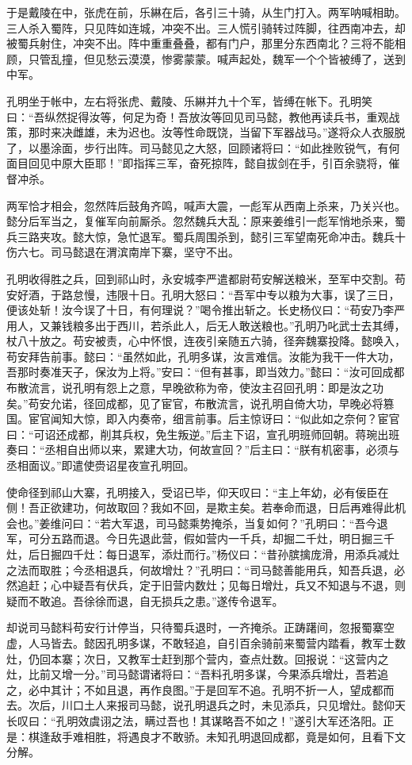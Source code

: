 于是戴陵在中，张虎在前，乐綝在后，各引三十骑，从生门打入。两军呐喊相助。三人杀入蜀阵，只见阵如连城，冲突不出。三人慌引骑转过阵脚，往西南冲去，却被蜀兵射住，冲突不出。阵中重重叠叠，都有门户，那里分东西南北？三将不能相顾，只管乱撞，但见愁云漠漠，惨雾蒙蒙。喊声起处，魏军一个个皆被缚了，送到中军。

孔明坐于帐中，左右将张虎、戴陵、乐綝并九十个军，皆缚在帐下。孔明笑曰：“吾纵然捉得汝等，何足为奇！吾放汝等回见司马懿，教他再读兵书，重观战策，那时来决雌雄，未为迟也。汝等性命既饶，当留下军器战马。”遂将众人衣服脱了，以墨涂面，步行出阵。司马懿见之大怒，回顾诸将曰：“如此挫败锐气，有何面目回见中原大臣耶！”即指挥三军，奋死掠阵，懿自拔剑在手，引百余骁将，催督冲杀。

两军恰才相会，忽然阵后鼓角齐鸣，喊声大震，一彪军从西南上杀来，乃关兴也。懿分后军当之，复催军向前厮杀。忽然魏兵大乱：原来姜维引一彪军悄地杀来，蜀兵三路夹攻。懿大惊，急忙退军。蜀兵周围杀到，懿引三军望南死命冲击。魏兵十伤六七。司马懿退在渭滨南岸下寨，坚守不出。

孔明收得胜之兵，回到祁山时，永安城李严遣都尉苟安解送粮米，至军中交割。苟安好酒，于路怠慢，违限十日。孔明大怒曰：“吾军中专以粮为大事，误了三日，便该处斩！汝今误了十日，有何理说？”喝令推出斩之。长史杨仪曰：“苟安乃李严用人，又兼钱粮多出于西川，若杀此人，后无人敢送粮也。”孔明乃叱武士去其缚，杖八十放之。苟安被责，心中怀恨，连夜引亲随五六骑，径奔魏寨投降。懿唤入，苟安拜告前事。懿曰：“虽然如此，孔明多谋，汝言难信。汝能为我干一件大功，吾那时奏准天子，保汝为上将。”安曰：“但有甚事，即当效力。”懿曰：“汝可回成都布散流言，说孔明有怨上之意，早晚欲称为帝，使汝主召回孔明：即是汝之功矣。”苟安允诺，径回成都，见了宦官，布散流言，说孔明自倚大功，早晚必将篡国。宦官闻知大惊，即入内奏帝，细言前事。后主惊讶曰：“似此如之奈何？宦官曰：“可诏还成都，削其兵权，免生叛逆。”后主下诏，宣孔明班师回朝。蒋琬出班奏曰：“丞相自出师以来，累建大功，何故宣回？”后主曰：“朕有机密事，必须与丞相面议。”即遣使赍诏星夜宣孔明回。

使命径到祁山大寨，孔明接入，受诏已毕，仰天叹曰：“主上年幼，必有佞臣在侧！吾正欲建功，何故取回？我如不回，是欺主矣。若奉命而退，日后再难得此机会也。”姜维问曰：“若大军退，司马懿乘势掩杀，当复如何？”孔明曰：“吾今退军，可分五路而退。今日先退此营，假如营内一千兵，却掘二千灶，明日掘三千灶，后日掘四千灶：每日退军，添灶而行。”杨仪曰：“昔孙膑擒庞滑，用添兵减灶之法而取胜；今丞相退兵，何故增灶？”孔明曰：“司马懿善能用兵，知吾兵退，必然追赶；心中疑吾有伏兵，定于旧营内数灶；见每日增灶，兵又不知退与不退，则疑而不敢追。吾徐徐而退，自无损兵之患。”遂传令退军。

却说司马懿料苟安行计停当，只待蜀兵退时，一齐掩杀。正踌躇间，忽报蜀寨空虚，人马皆去。懿因孔明多谋，不敢轻追，自引百余骑前来蜀营内踏看，教军士数灶，仍回本寨；次日，又教军士赶到那个营内，查点灶数。回报说：“这营内之灶，比前又增一分。”司马懿谓诸将曰：“吾料孔明多谋，今果添兵增灶，吾若追之，必中其计；不如且退，再作良图。”于是回军不追。孔明不折一人，望成都而去。次后，川口土人来报司马懿，说孔明退兵之时，未见添兵，只见增灶。懿仰天长叹曰：“孔明效虞诩之法，瞒过吾也！其谋略吾不如之！”遂引大军还洛阳。正是：棋逢敌手难相胜，将遇良才不敢骄。未知孔明退回成都，竟是如何，且看下文分解。